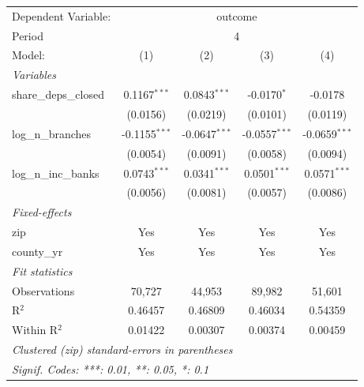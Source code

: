 \begingroup
\centering
\begin{tabular}{lcccc}
   \tabularnewline \midrule \midrule
   Dependent Variable: & \multicolumn{4}{c}{outcome}\\
   Period & \multicolumn{4}{c}{4} \\ 
   Model:                & (1)             & (2)             & (3)             & (4)\\  
   \midrule
   \emph{Variables}\\
   share\_deps\_closed   & 0.1167$^{***}$  & 0.0843$^{***}$  & -0.0170$^{*}$   & -0.0178\\   
                         & (0.0156)        & (0.0219)        & (0.0101)        & (0.0119)\\   
   log\_n\_branches      & -0.1155$^{***}$ & -0.0647$^{***}$ & -0.0557$^{***}$ & -0.0659$^{***}$\\   
                         & (0.0054)        & (0.0091)        & (0.0058)        & (0.0094)\\   
   log\_n\_inc\_banks    & 0.0743$^{***}$  & 0.0341$^{***}$  & 0.0501$^{***}$  & 0.0571$^{***}$\\   
                         & (0.0056)        & (0.0081)        & (0.0057)        & (0.0086)\\   
   \midrule
   \emph{Fixed-effects}\\
   zip                   & Yes             & Yes             & Yes             & Yes\\  
   county\_yr            & Yes             & Yes             & Yes             & Yes\\  
   \midrule
   \emph{Fit statistics}\\
   Observations          & 70,727          & 44,953          & 89,982          & 51,601\\  
   R$^2$                 & 0.46457         & 0.46809         & 0.46034         & 0.54359\\  
   Within R$^2$          & 0.01422         & 0.00307         & 0.00374         & 0.00459\\  
   \midrule \midrule
   \multicolumn{5}{l}{\emph{Clustered (zip) standard-errors in parentheses}}\\
   \multicolumn{5}{l}{\emph{Signif. Codes: ***: 0.01, **: 0.05, *: 0.1}}\\
\end{tabular}
\par\endgroup
